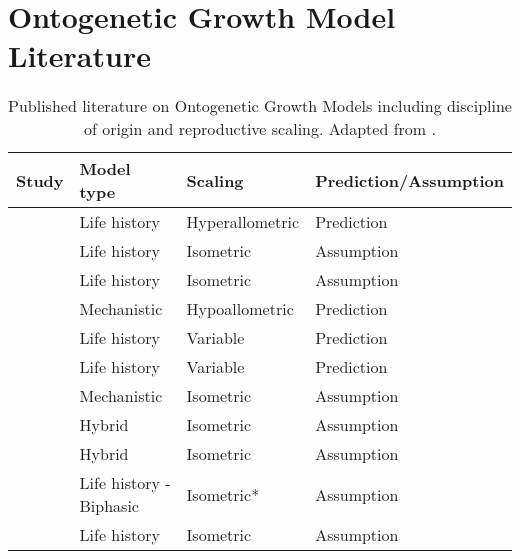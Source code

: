 \documentclass[a4paper]{article} %
\begin{document}
\newpage
\section{Ontogenetic Growth Model Literature}

\begin{table}[H]
    \caption{Published literature on Ontogenetic Growth Models including discipline of origin and reproductive scaling. Adapted from \cite{Barneche2018d}.}
    \begin{tabular}{|l|l|l|l|}
    \hline
    \textbf{Study}                      & \textbf{Model type}       & \textbf{Scaling} & \textbf{Prediction/Assumption} \\ \hline
    \cite{Gadgil1970}                   & Life history              & Hyperallometric  & Prediction                     \\ \hline
    \cite{Roff1983}                     & Life history              & Isometric        & Assumption                     \\ \hline
    \cite{Roff1984}                     & Life history              & Isometric        & Assumption                     \\ \hline
    \cite{Reiss1985}                    & Mechanistic               & Hypoallometric   & Prediction                     \\ \hline
    \cite{Kozowski1987-indeterminate}   & Life history              & Variable         & Prediction                     \\ \hline
    \cite{kozlowski1996}                & Life history              & Variable         & Prediction                     \\ \hline
    \cite{West2001}                     & Mechanistic               & Isometric        & Assumption                     \\ \hline
    \cite{Charnov2001}                  & Hybrid                    & Isometric        & Assumption                     \\ \hline
    \cite{Charnov2002}                  & Hybrid                    & Isometric        & Assumption                     \\ \hline
    \cite{Lester2004}                   & Life history - Biphasic   & Isometric*       & Assumption                     \\ \hline
    \cite{Roff2006}                     & Life history              & Isometric        & Assumption                     \\ \hline

\end{tabular}
\end{table}
\end{document}
